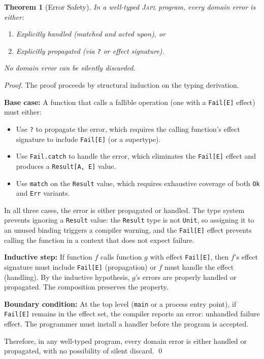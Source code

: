 \documentclass[11pt,twocolumn]{article}
\newtheorem{theorem}{Theorem}[section]
\newcommand{\japl}{\textsc{Japl}}
\begin{document}
\begin{theorem}[Error Safety]\label{thm:error-safety}
In a well-typed \japl{} program, every domain error is either:
\begin{enumerate}
  \item Explicitly handled (matched and acted upon), or
  \item Explicitly propagated (via \texttt{?} or effect signature).
\end{enumerate}
No domain error can be silently discarded.
\end{theorem}

\begin{proof}
The proof proceeds by structural induction on the typing derivation.

\textbf{Base case:} A function that calls a fallible operation (one with a \texttt{Fail[E]} effect) must either:
\begin{itemize}
  \item Use \texttt{?} to propagate the error, which requires the calling function's effect signature to include \texttt{Fail[E]} (or a supertype).
  \item Use \texttt{Fail.catch} to handle the error, which eliminates the \texttt{Fail[E]} effect and produces a \texttt{Result[A, E]} value.
  \item Use \texttt{match} on the \texttt{Result} value, which requires exhaustive coverage of both \texttt{Ok} and \texttt{Err} variants.
\end{itemize}

In all three cases, the error is either propagated or handled. The type system prevents ignoring a \texttt{Result} value: the \texttt{Result} type is not \texttt{Unit}, so assigning it to an unused binding triggers a compiler warning, and the \texttt{Fail[E]} effect prevents calling the function in a context that does not expect failure.

\textbf{Inductive step:} If function $f$ calls function $g$ with effect \texttt{Fail[E]}, then $f$'s effect signature must include \texttt{Fail[E]} (propagation) or $f$ must handle the effect (handling). By the inductive hypothesis, $g$'s errors are properly handled or propagated. The composition preserves the property.

\textbf{Boundary condition:} At the top level (\texttt{main} or a process entry point), if \texttt{Fail[E]} remains in the effect set, the compiler reports an error: unhandled failure effect. The programmer must install a handler before the program is accepted.

Therefore, in any well-typed program, every domain error is either handled or propagated, with no possibility of silent discard. \qed
\end{proof}
\end{document}
